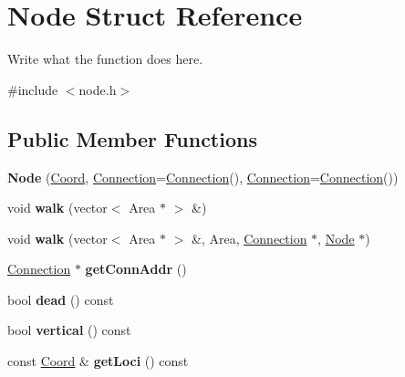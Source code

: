 \hypertarget{classNode}{\section{Node Struct Reference}
\label{classNode}
}


Write what the function does here.  




{\ttfamily \#include $<$node.\+h$>$}

\subsection*{Public Member Functions}
\begin{DoxyCompactItemize}
\item 
\hypertarget{classNode_a8967a8ea2f7e45ab5d400eb4fb5a5b8f}{{\bfseries Node} (\hyperlink{structCoord}{Coord}, \hyperlink{structConnection}{Connection}=\hyperlink{structConnection}{Connection}(), \hyperlink{structConnection}{Connection}=\hyperlink{structConnection}{Connection}())}\label{classNode_a8967a8ea2f7e45ab5d400eb4fb5a5b8f}

\item 
\hypertarget{classNode_aa7323fcd726f9d02be5a36017b983b2d}{void {\bfseries walk} (vector$<$ Area $\ast$ $>$ \&)}\label{classNode_aa7323fcd726f9d02be5a36017b983b2d}

\item 
\hypertarget{classNode_aed462601aaebbbf910008326032619c6}{void {\bfseries walk} (vector$<$ Area $\ast$ $>$ \&, Area, \hyperlink{structConnection}{Connection} $\ast$, \hyperlink{classNode}{Node} $\ast$)}\label{classNode_aed462601aaebbbf910008326032619c6}

\item 
\hypertarget{classNode_a84e440c7e885d9c9e2e72386a351ddb3}{\hyperlink{structConnection}{Connection} $\ast$ {\bfseries get\+Conn\+Addr} ()}\label{classNode_a84e440c7e885d9c9e2e72386a351ddb3}

\item 
\hypertarget{classNode_abef94e6f9dd2576fe364fd0cb8257d9e}{bool {\bfseries dead} () const }\label{classNode_abef94e6f9dd2576fe364fd0cb8257d9e}

\item 
\hypertarget{classNode_aa76d8f65bb797e4e84a4d9dbdd933294}{bool {\bfseries vertical} () const }\label{classNode_aa76d8f65bb797e4e84a4d9dbdd933294}

\item 
\hypertarget{classNode_aa125f823cfc1231e0ba5f50e6a742db6}{const \hyperlink{structCoord}{Coord} \& {\bfseries get\+Loci} () const }\label{classNode_aa125f823cfc1231e0ba5f50e6a742db6}


\end{DoxyCompactItemize}
